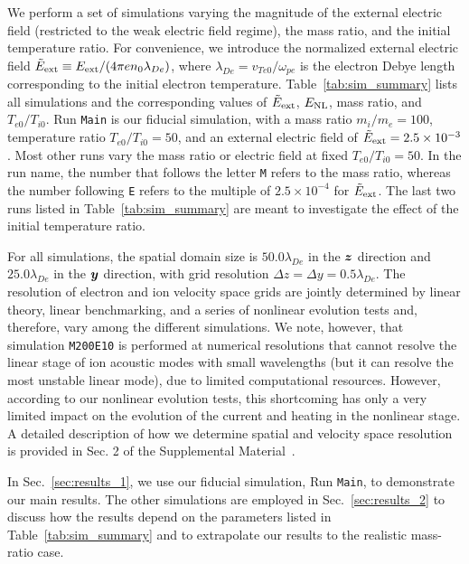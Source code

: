 \documentclass[%
 reprint,
 amsmath,
 amssymb,
 aps,
 prx,
floatfix,
superscriptaddress
]{revtex4-2}
\newcommand\bb[1]{\mbox{\boldmath{$#1$}}}
\begin{document}
We perform a set of simulations varying the magnitude of the external electric field (restricted to the weak electric field regime), the mass ratio, and the initial temperature ratio. 
For convenience, we introduce the normalized external electric field $\tilde{E}_{\rm{ext}} \equiv  E_{\rm ext}/ (4\pi e n_0 \lambda_{De})$, where $\lambda_{De} = v_{Te0}/\omega_{pe}$ is the electron Debye length corresponding to the initial electron temperature.
Table~\ref{tab:sim_summary} lists all simulations and the corresponding values of $\tilde{E}_{\rm{ext}}$, $E_{\rm NL}$, mass ratio, and $T_{e0}/T_{i0}$.
Run {\tt Main} is our fiducial simulation, with a mass ratio $m_i/m_e=100$, temperature ratio $T_{e0}/T_{i0}=50$, and an external electric field of $\tilde{E}_{\rm{ext}} =  2.5\times 10^{-3}$. 
Most other runs vary the mass ratio or electric field at fixed $T_{e0}/T_{i0}=50$. 
In the run name, the number that follows the letter {\tt M} refers to the mass ratio, whereas the number following {\tt E} refers to the multiple of $2.5\times 10^{-4}$ for $\tilde{E}_{\rm{ext}}$.
The last two runs listed in Table~\ref{tab:sim_summary} are meant to investigate the effect of the initial temperature ratio.

For all simulations, the spatial domain size is $50.0 \lambda_{De}$ in the $\bb{z}$ direction and $25.0 \lambda_{De}$ in the $\bb{y}$ direction, with grid resolution $\Delta z = \Delta y = 0.5\lambda_{De}$.
The resolution of electron and ion velocity space grids are jointly determined by linear theory, linear benchmarking, and a series of nonlinear evolution tests and, therefore, vary among the different simulations. 
We note, however, that simulation  {\tt M200E10} is performed at numerical resolutions that cannot resolve the linear stage of ion acoustic modes with small wavelengths (but it can resolve the most unstable linear mode), due to limited computational resources. 
However, according to our nonlinear evolution tests, this shortcoming has only a very limited impact on the evolution of the current and heating in the nonlinear stage.
A detailed description of how we determine spatial and velocity space resolution is provided in Sec. 2 of the Supplemental Material~\cite{SM}.

In Sec.~\ref{sec:results_1}, we use our fiducial simulation, Run {\tt Main}, to demonstrate our main results.
The other simulations are employed in Sec.~\ref{sec:results_2} to discuss how the results depend on the parameters listed in Table~\ref{tab:sim_summary} and to extrapolate our results to the realistic mass-ratio case.
\end{document}
